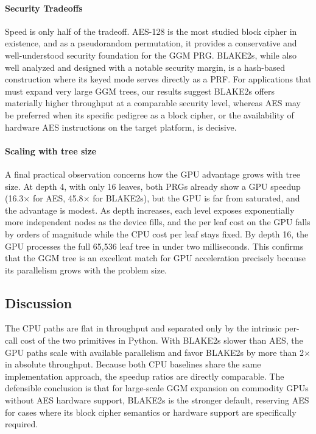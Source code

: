 \documentclass[conference]{IEEEtran}
\begin{document}
\paragraph{Security Tradeoffs}
Speed is only half of the tradeoff. AES-128 is the most studied block cipher in existence, and as a pseudorandom permutation, it provides a conservative and well-understood security foundation for the GGM PRG. BLAKE2s, while also well analyzed and designed with a notable security margin, is a hash-based construction where its keyed mode serves directly as a PRF. For applications that must expand very large GGM trees, our results suggest BLAKE2s offers materially higher throughput at a comparable security level, whereas AES may be preferred when its specific pedigree as a block cipher, or the availability of hardware AES instructions on the target platform, is decisive.

\paragraph{Scaling with tree size}
A final practical observation concerns how the GPU advantage grows with tree size. At depth 4, with only 16 leaves, both PRGs already show a GPU speedup (16.3$\times$ for AES, 45.8$\times$ for BLAKE2s), but the GPU is far from saturated, and the advantage is modest. As depth increases, each level exposes exponentially more independent nodes as the device fills, and the per leaf cost on the GPU falls by orders of magnitude while the CPU cost per leaf stays fixed. By depth 16, the GPU processes the full 65,536 leaf tree in under two milliseconds. This confirms that the GGM tree is an excellent match for GPU acceleration precisely because its parallelism grows with the problem size.

\subsection{Discussion}
The CPU paths are flat in throughput and separated only by the intrinsic per-call cost of the two primitives in Python. With BLAKE2s slower than AES, the GPU paths scale with available parallelism and favor BLAKE2s by more than 2$\times$ in absolute throughput. Because both CPU baselines share the same implementation approach, the speedup ratios are directly comparable. The defensible conclusion is that for large-scale GGM expansion on commodity GPUs without AES hardware support, BLAKE2s is the stronger default, reserving AES for cases where its block cipher semantics or hardware support are specifically required.
\end{document}
